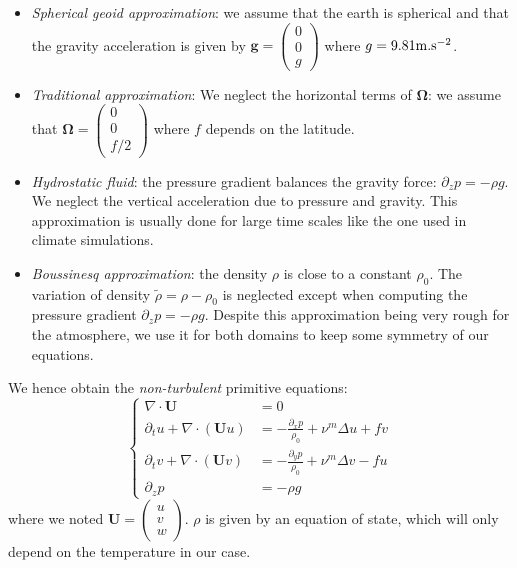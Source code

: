 \begin{itemize}
\item \textit{Spherical geoid approximation}:
we assume that the earth is spherical and that the
gravity acceleration is given by
$\mathbf{g} =\begin{pmatrix}
0\\ 0 \\ g
\end{pmatrix}$ where $g=9.81 {\rm m}.{\rm s}^{-2}$.
\item \textit{Traditional approximation}:
We neglect the horizontal terms of
$\mathbf{\Omega}$: we assume that
$\mathbf{\Omega} =\begin{pmatrix}
0\\ 0 \\ f/2
\end{pmatrix}$ where $f$ depends on the latitude.
\item \textit{Hydrostatic fluid}:
the pressure gradient balances the gravity force:
$\partial_z p = -\rho g$. We neglect the vertical
acceleration due to pressure and gravity.
This approximation is usually done for large time
scales like the one used in climate simulations.
\item \textit{Boussinesq approximation}:
the density $\rho$ is close to a constant $\rho_0$.
The variation of density $\widetilde{\rho} =
\rho - \rho_0$ is neglected except when computing
the pressure gradient $\partial_z p = - \rho g$.
Despite this approximation being very rough
for the atmosphere, we use it for both domains
to keep some symmetry of our equations.
\end{itemize}
We hence obtain the \textit{non-turbulent}
primitive equations:
\begin{equation}
	\label{eq:airseaSCM_nonTurbulentPrimitiveEq}
\begin{cases}
	\nabla \cdot \mathbf{U} &= 0 \\
	\partial_t u + \nabla \cdot (\mathbf{U} u) &=
	- \frac{\partial_x p}{\rho_0} + \nu^m \Delta u
	+ f v \\
	\partial_t v + \nabla \cdot (\mathbf{U} v) &=
	- \frac{\partial_y p}{\rho_0} + \nu^m \Delta v
	- f u \\
	\partial_z p &= -\rho g
\end{cases}
\end{equation}
where we noted $\mathbf{U} = \begin{pmatrix}u\\v\\w\end{pmatrix}$.
$\rho$ is given by an equation of state, which will only depend on
the temperature in our case. 
